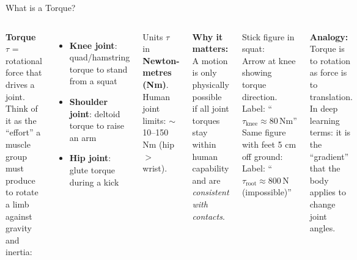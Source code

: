 \documentclass[aspectratio=169, 10pt]{beamer}
\begin{document}
\begin{frame}{What is a Torque?}
  \begin{columns}[T]
      \textbf{Torque $\tau$} = rotational force that drives a joint.\\[0.5em]

      Think of it as the ``effort'' a muscle group must produce to rotate
      a limb against gravity and inertia:
      \vspace{0.4em}
      \begin{itemize}
        \item \textbf{Knee joint}: quad/hamstring torque to stand from a squat
        \item \textbf{Shoulder joint}: deltoid torque to raise an arm
        \item \textbf{Hip joint}: glute torque during a kick
      \end{itemize}

      \vspace{0.6em}
      \begin{block}{Units}
        $\tau$ in \textbf{Newton-metres (Nm)}.\\
        Human joint limits: $\sim$10--150 Nm (hip $>$ wrist).
      \end{block}

      \vspace{0.4em}
      \textbf{Why it matters:}
      A motion is only physically possible if all joint torques
      stay within human capability and are \emph{consistent with contacts}.

      \begin{tcolorbox}[colback=lightyellow, colframe=notegray,
                        title={\small [IMG]Suggested figure}]
        \small Stick figure in squat:\\
        Arrow at knee showing torque direction.\\
        Label: ``$\tau_\text{knee} \approx 80\,\text{Nm}$''\\[0.5em]
        Same figure with feet 5 cm off ground:\\
        Label: ``$\tau_\text{root} \approx 800\,\text{N}$ (impossible)''
      \end{tcolorbox}

      \vspace{0.5em}
      \begin{tcolorbox}[colback=physblue!10, colframe=physblue]
        \small \textbf{Analogy:} Torque is to rotation as force is to translation.\\
        In deep learning terms: it is the ``gradient'' that the body applies
        to change joint angles.
      \end{tcolorbox}
  \end{columns}
\end{frame}
\end{document}
